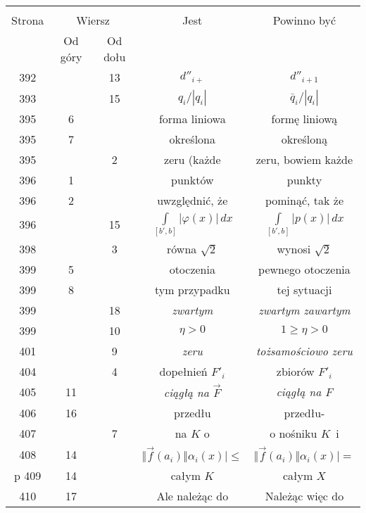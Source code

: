 \documentclass[a4paper,11pt]{article}
\begin{document}
\begin{center}

  \begin{tabular}{|c|c|c|c|c|}
    \hline
    & \multicolumn{2}{c|}{} & & \\
    Strona & \multicolumn{2}{c|}{Wiersz} & Jest
                              & Powinno być \\ \cline{2-3}
    & Od góry & Od dołu & & \\
    \hline
    392 & & 13 & $d''_{ i + }$ & $d''_{ i + 1 }$ \\
    393 & & 15 & $q_{ i } / | q_{ i } |$ & $\bar{ q }_{ i } / | q_{ i } |$ \\
    395 &  6 & & forma liniowa & formę liniową \\
    395 &  7 & & określona & określoną \\
    395 & &  2 & zeru (każde & zeru, bowiem każde \\
    396 &  1 & & punktów & punkty \\
    396 &  2 & & uwzględnić, że & pominąć, tak że \\
    396 & & 15 & $\int\limits_{ [ b', b ] } | \varphi( x ) | \, dx$
           & $\int\limits_{ [ b', b ] } | p( x ) | \, dx$ \\
    398 & &  3 & równa $\sqrt{ 2 }$ & wynosi $\sqrt{ 2 }$ \\
    399 &  5 & & otoczenia & pewnego otoczenia \\
    399 &  8 & & tym przypadku & tej sytuacji \\
    399 & & 18 & \textit{zwartym} & \textit{zwartym zawartym} \\
    399 & & 10 & $\eta > 0$ & $1 \geq \eta > 0$ \\
    401 & &  9 & \textit{zeru} & \textit{tożsamościowo zeru} \\
    404 & &  4 & dopełnień $F'_{ i }$ & zbiorów $F'_{ i }$ \\
    405 & 11 & & \textit{ciągłą na $\vec{ F }$} & \textit{ciągłą na $F$} \\
    406 & 16 & & przedłu & przedłu- \\
    407 & &  7 & na $K$ o & o nośniku $K$~i \\
    408 & 14 & & $\Vert \vec{ f }( a_{ i } ) \Vert \alpha_{ i }( x ) \big| \leq$
           & $\Vert \vec{ f }( a_{ i } ) \Vert \alpha_{ i }( x ) \big| =$ \\p
    409 & 14 & & całym $K$ & całym $X$ \\
    410 & 17 & & Ale należąc do & Należąc więc do \\

\end{tabular}
\end{center}
\end{document}
